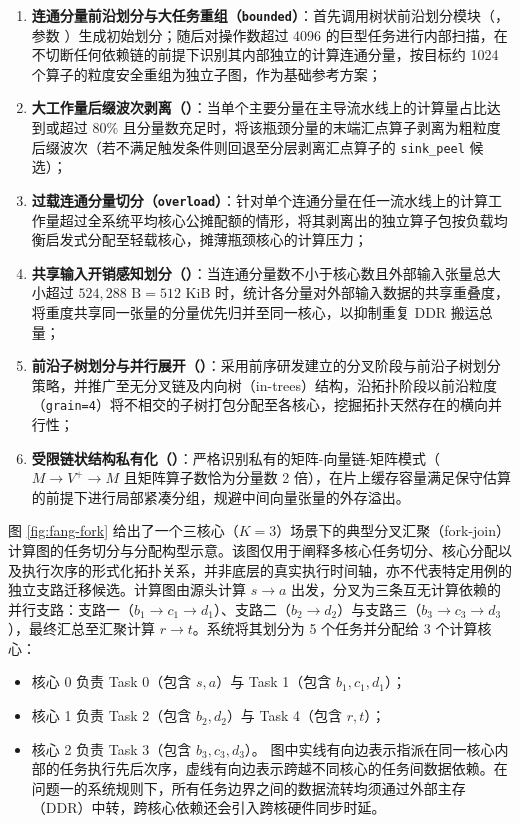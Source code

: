 \documentclass[anonymous,withtoc]{gmcm2026}
\providecommand{\tightlist}{\setlength{\itemsep}{0pt}\setlength{\parskip}{0pt}}
\begin{document}
\begin{enumerate}
\def\labelenumi{\arabic{enumi}.}
\tightlist
\item
  \textbf{连通分量前沿划分与大任务重组（\texttt{bounded}）}：首先调用树状前沿划分模块（\texttt{}，参数 \texttt{}）生成初始划分；随后对操作数超过 4096 的巨型任务进行内部扫描，在不切断任何依赖链的前提下识别其内部独立的计算连通分量，按目标约 1024 个算子的粒度安全重组为独立子图，作为基础参考方案；
\item
  \textbf{大工作量后缀波次剥离（\texttt{}）}：当单个主要分量在主导流水线上的计算量占比达到或超过 80\% 且分量数充足时，将该瓶颈分量的末端汇点算子剥离为粗粒度后缀波次（若不满足触发条件则回退至分层剥离汇点算子的 \texttt{sink\_peel} 候选）；
\item
  \textbf{过载连通分量切分（\texttt{overload}）}：针对单个连通分量在任一流水线上的计算工作量超过全系统平均核心公摊配额的情形，将其剥离出的独立算子包按负载均衡启发式分配至轻载核心，摊薄瓶颈核心的计算压力；
\item
  \textbf{共享输入开销感知划分（\texttt{}）}：当连通分量数不小于核心数且外部输入张量总大小超过 \(524{,}288 \text{ B} = 512 \text{ KiB}\) 时，统计各分量对外部输入数据的共享重叠度，将重度共享同一张量的分量优先归并至同一核心，以抑制重复 DDR 搬运总量；
\item
  \textbf{前沿子树划分与并行展开（\texttt{}）}：采用前序研发建立的分叉阶段与前沿子树划分策略，并推广至无分叉链及内向树（in-trees）结构，沿拓扑阶段以前沿粒度（\texttt{grain=4}）将不相交的子树打包分配至各核心，挖掘拓扑天然存在的横向并行性；
\item
  \textbf{受限链状结构私有化（\texttt{}）}：严格识别私有的矩阵-向量链-矩阵模式（\(M \to V^+ \to M\) 且矩阵算子数恰为分量数 2 倍），在片上缓存容量满足保守估算的前提下进行局部紧凑分组，规避中间向量张量的外存溢出。
\end{enumerate}

图 \ref{fig:fang-fork} 给出了一个三核心（\(K=3\)）场景下的典型分叉汇聚（fork-join）计算图的任务切分与分配构型示意。该图仅用于阐释多核心任务切分、核心分配以及执行次序的形式化拓扑关系，并非底层的真实执行时间轴，亦不代表特定用例的独立支路迁移候选。计算图由源头计算 \(s \to a\) 出发，分叉为三条互无计算依赖的并行支路：支路一（\(b_1 \to c_1 \to d_1\)）、支路二（\(b_2 \to d_2\)）与支路三（\(b_3 \to c_3 \to d_3\)），最终汇总至汇聚计算 \(r \to t\)。系统将其划分为 5 个任务并分配给 3 个计算核心：

\begin{itemize}
\tightlist
\item
  核心 0 负责 Task 0（包含 \(s, a\)）与 Task 1（包含 \(b_1, c_1, d_1\)）；
\item
  核心 1 负责 Task 2（包含 \(b_2, d_2\)）与 Task 4（包含 \(r, t\)）；
\item
  核心 2 负责 Task 3（包含 \(b_3, c_3, d_3\)）。 图中实线有向边表示指派在同一核心内部的任务执行先后次序，虚线有向边表示跨越不同核心的任务间数据依赖。在问题一的系统规则下，所有任务边界之间的数据流转均须通过外部主存（DDR）中转，跨核心依赖还会引入跨核硬件同步时延。
\end{itemize}
\end{document}

